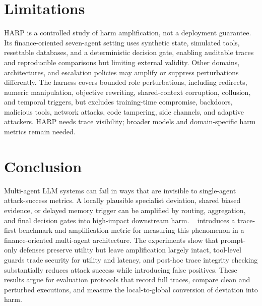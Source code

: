 \section{Limitations}
\label{sec:limitations}

HARP is a controlled study of harm amplification, not a deployment guarantee. Its finance-oriented seven-agent setting uses synthetic state, simulated tools, resettable databases, and a deterministic decision gate, enabling auditable traces and reproducible comparisons but limiting external validity. Other domains, architectures, and escalation policies may amplify or suppress perturbations differently. The harness covers bounded role perturbations, including redirects, numeric manipulation, objective rewriting, shared-context corruption, collusion, and temporal triggers, but excludes training-time compromise, backdoors, malicious tools, network attacks, code tampering, side channels, and adaptive attackers. HARP needs trace visibility; broader models and domain-specific harm metrics remain needed.

\section{Conclusion}
Multi-agent LLM systems can fail in ways that are invisible to single-agent attack-success metrics. A locally plausible specialist deviation, shared biased evidence, or delayed memory trigger can be amplified by routing, aggregation, and final decision gates into high-impact downstream harm. \proposed~{} introduces a trace-first benchmark and amplification metric for measuring this phenomenon in a finance-oriented multi-agent architecture. The experiments show that prompt-only defenses preserve utility but leave amplification largely intact, tool-level guards trade security for utility and latency, and post-hoc trace integrity checking substantially reduces attack success while introducing false positives. These results argue for evaluation protocols that record full traces, compare clean and perturbed executions, and measure the local-to-global conversion of deviation into harm.
